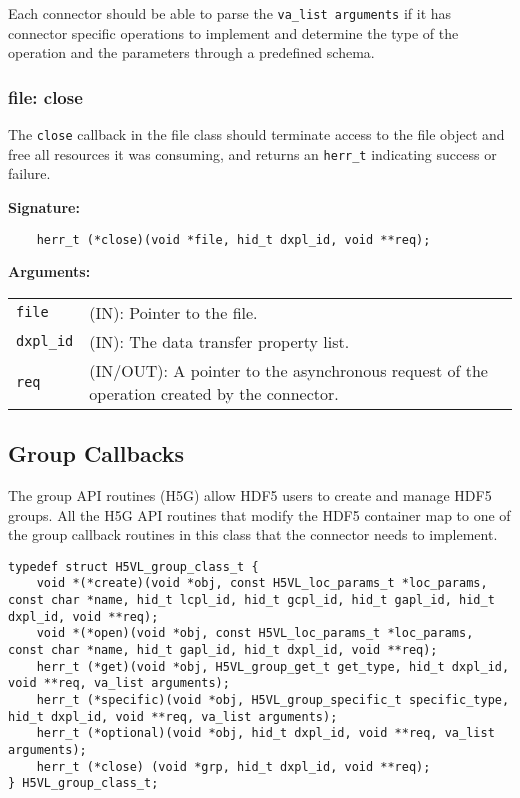Each connector should be able to parse the \texttt{va\_list arguments} if it has connector specific operations to implement and determine the type of the operation and the parameters through a predefined schema.

\subsubsection{file: close}
The \texttt{close} callback in the file class should terminate access to
the file object and free all resources it was consuming, and returns
an \texttt{herr\_t} indicating success or failure.\bigskip\bigskip

\begin{mdframed}[style=bgbox]
\textbf{Signature:}
\begin{lstlisting}
    herr_t (*close)(void *file, hid_t dxpl_id, void **req);
\end{lstlisting}

\textbf{Arguments:}\\
\begin{tabular}{l p{13.5cm}}
  \texttt{file} & (IN): Pointer to the file.\\
  \texttt{dxpl\_id} & (IN): The data transfer property list.\\
  \texttt{req} & (IN/OUT): A pointer to the asynchronous request of the
  operation created by the connector.\\
\end{tabular}
\end{mdframed}


\subsection{Group Callbacks}
The group API routines (H5G) allow HDF5 users to create and manage
HDF5 groups. All the H5G API routines that modify the HDF5 container
map to one of the group callback routines in this class that the
connector needs to implement.

\begin{lstlisting}[caption={Structure for group callback routines, H5VLconnector.h}, captionpos=b, label={lst:Groupclass}]
typedef struct H5VL_group_class_t {                                              
    void *(*create)(void *obj, const H5VL_loc_params_t *loc_params, const char *name, hid_t lcpl_id, hid_t gcpl_id, hid_t gapl_id, hid_t dxpl_id, void **req);
    void *(*open)(void *obj, const H5VL_loc_params_t *loc_params, const char *name, hid_t gapl_id, hid_t dxpl_id, void **req);
    herr_t (*get)(void *obj, H5VL_group_get_t get_type, hid_t dxpl_id, void **req, va_list arguments);
    herr_t (*specific)(void *obj, H5VL_group_specific_t specific_type, hid_t dxpl_id, void **req, va_list arguments);
    herr_t (*optional)(void *obj, hid_t dxpl_id, void **req, va_list arguments);
    herr_t (*close) (void *grp, hid_t dxpl_id, void **req);
} H5VL_group_class_t; 
\end{lstlisting}

